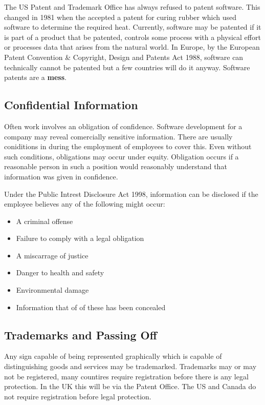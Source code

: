 \documentclass{article}
\begin{document}
	\par 
	The US Patent and Trademark Office has always refused to patent software. This changed in 1981 when the accepted a patent for curing rubber which used software to determine the required heat. Currently, software may be patented if it is part of a product that be patented, controls some process with a physical effort or processes data that arises from the natural world. In Europe, by the European Patent Convention \& Copyright, Design and Patents Act 1988, software can technically cannot be patented but a few countries will do it anyway. Software patents are a \textbf{mess}.
	
	\subsection{Confidential Information}
	Often work involves an obligation of confidence. Software development for a company may reveal comercially sensitive information. There are usually coniditions in during the employment of employees to cover this. Even without such conditions, obligations may occur under equity. Obligation occurs if a reasonable person in such a position would reasonably understand that information was given in confidence. 
	
	\par 
	Under the Public Intrest Disclosure Act 1998, information can be disclosed if the employee believes any of the following might occur:
	\begin{itemize}
	\item A criminal offense
	\item Failure to comply with a legal obligation
	\item A miscarrage of justice
	\item Danger to health and safety
	\item Environmental damage
	\item Information that of of these has been concealed
	\end{itemize}
	
	\subsection{Trademarks and Passing Off}
	Any sign capable of being represented graphically which is capable of distinguishing goods and services may be trademarked. Trademarks may or may not be registered, many countires require registration before there is any legal protection. In the UK this will be via the Patent Office. The US and Canada do not require registration before legal protection. 
	
\end{document}

